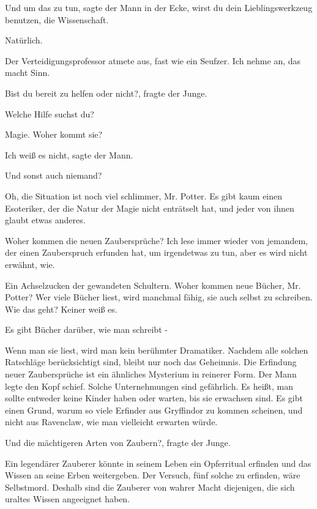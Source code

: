 \glqq{}Und um das zu tun\grqq{}, sagte der Mann in der Ecke, \glqq{}wirst du dein
Lieblingswerkzeug benutzen, die Wissenschaft.\grqq{}

\glqq{}Natürlich.\grqq{}

Der Verteidigungsprofessor atmete aus, fast wie ein Seufzer. \glqq{}Ich nehme an,
das macht Sinn.\grqq{}

\glqq{}Bist du bereit zu helfen oder nicht?\grqq{}, fragte der Junge.

\glqq{}Welche Hilfe suchst du?\grqq{}

\glqq{}Magie. Woher kommt sie?\grqq{}

\glqq{}Ich weiß es nicht\grqq{}, sagte der Mann.

\glqq{}Und sonst auch niemand?\grqq{}

\glqq{}Oh, die Situation ist noch viel schlimmer, Mr. Potter. Es gibt kaum einen
Esoteriker, der die Natur der Magie nicht enträtselt hat, und jeder von ihnen
glaubt etwas anderes.\grqq{}

\glqq{}Woher kommen die neuen Zaubersprüche? Ich lese immer wieder von jemandem,
der einen Zauberspruch erfunden hat, um irgendetwas zu tun, aber es wird nicht
erwähnt, wie.\grqq{}

Ein Achselzucken der gewandeten Schultern. \glqq{}Woher kommen neue Bücher, Mr.
Potter? Wer viele Bücher liest, wird manchmal fähig, sie auch selbst zu
schreiben. Wie das geht? Keiner weiß es.\grqq{}

\glqq{}Es gibt Bücher darüber, wie man schreibt -\grqq{}

\glqq{}Wenn man sie liest, wird man kein berühmter Dramatiker. Nachdem alle
solchen Ratschläge berücksichtigt sind, bleibt nur noch das Geheimnis. Die
Erfindung neuer Zaubersprüche ist ein ähnliches Mysterium in reinerer
Form.\grqq{} Der Mann legte den Kopf schief. \glqq{}Solche Unternehmungen sind
gefährlich. Es heißt, man sollte entweder keine Kinder haben oder warten, bis
sie erwachsen sind. Es gibt einen Grund, warum so viele Erfinder aus Gryffindor
zu kommen scheinen, und nicht aus Ravenclaw, wie man vielleicht erwarten
würde.\grqq{}

\glqq{}Und die mächtigeren Arten von Zaubern?\grqq{}, fragte der Junge.

\glqq{}Ein legendärer Zauberer könnte in seinem Leben ein Opferritual erfinden
und das Wissen an seine Erben weitergeben. Der Versuch, fünf solche zu erfinden,
wäre Selbstmord. Deshalb sind die Zauberer von wahrer Macht diejenigen, die sich
uraltes Wissen angeeignet haben.\grqq{}

